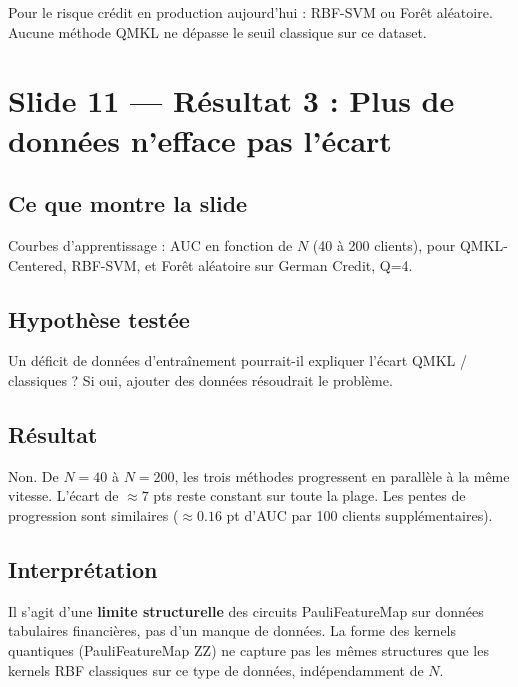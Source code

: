 \documentclass[12pt, a4paper]{article}
\begin{document}
\begin{retenir}
Pour le risque crédit en production aujourd'hui : RBF-SVM ou Forêt aléatoire.
Aucune méthode QMKL ne dépasse le seuil classique sur ce dataset.
\end{retenir}

\section{Slide 11 — Résultat 3 : Plus de données n'efface pas l'écart}

\subsection*{Ce que montre la slide}

Courbes d'apprentissage : AUC en fonction de $N$ (40 à 200 clients),
pour QMKL-Centered, RBF-SVM, et Forêt aléatoire sur German Credit, Q=4.

\subsection*{Hypothèse testée}

Un déficit de données d'entraînement pourrait-il expliquer l'écart QMKL / classiques ?
Si oui, ajouter des données résoudrait le problème.

\subsection*{Résultat}

Non. De $N=40$ à $N=200$, les trois méthodes progressent en parallèle à la même vitesse.
L'écart de $\approx 7$ pts reste constant sur toute la plage.
Les pentes de progression sont similaires ($\approx 0.16$ pt d'AUC par 100 clients supplémentaires).

\subsection*{Interprétation}

Il s'agit d'une \textbf{limite structurelle} des circuits PauliFeatureMap sur données tabulaires financières,
pas d'un manque de données. La forme des kernels quantiques (PauliFeatureMap ZZ)
ne capture pas les mêmes structures que les kernels RBF classiques sur ce type de données,
indépendamment de $N$.
\end{document}
